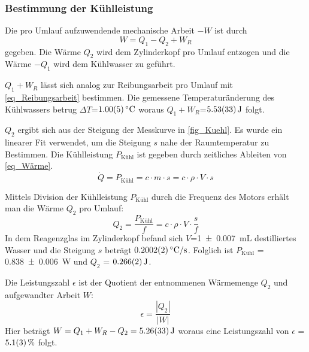 \documentclass[
	a4paper,
	12pt,
	pagesize,
	ngerman
]{scrartcl}
\begin{document}
	\subsubsection{Bestimmung der Kühlleistung} \label{sssec_Kühlleistung}
	Die pro Umlauf aufzuwendende mechanische Arbeit $-W$ ist durch
	\begin{equation}
	W =  Q_1 - Q_2 + W_R
	\end{equation}
	gegeben.
	Die Wärme $Q_2$ wird dem Zylinderkopf pro Umlauf entzogen und die Wärme $-Q_1$ wird dem Kühlwasser zu geführt.
	
	$Q_1+W_R$ lässt sich analog zur Reibungsarbeit pro Umlauf mit \cref{eq_Reibungsarbeit} bestimmen.	
	Die gemessene Temperaturänderung des Kühlwassers betrug $\Delta{T}$=$\SI{1,0+-0,05}{\degreeCelsius}$ woraus $Q_1+W_R$=$\SI{5,53+-0,33}{J}$ folgt.
	
	$Q_2$ ergibt sich aus der Steigung der Messkurve in \cref{fig_Kuehl}.
	Es wurde ein linearer Fit verwendet, um die Steigung $s$ nahe der Raumtemperatur zu Bestimmen.
	Die Kühlleistung $P_\text{Kühl}$ ist gegeben durch zeitliches Ableiten von \cref{eq_Wärme}.
	\begin{equation}
	\dot{Q} = P_\text{Kühl} = c \cdot m \cdot s = c \cdot \rho \cdot V \cdot s 
	\label{eq_Kühlleistung}
	\end{equation}
	
	Mittels Division der Kühlleistung $P_\text{Kühl}$ durch die Frequenz des Motors erhält man die Wärme $Q_2$ pro Umlauf:
	\begin{equation}
	Q_2 = \frac{P_\text{Kühl}}{f} = c \cdot \rho \cdot V \cdot \frac{s}{f}	
	\end{equation}
	In dem Reagenzglas im Zylinderkopf befand sich $V$=\SI{1+- 0,007}{mL} destilliertes Wasser und die Steigung $s$ beträgt $\SI{0,2002+-0,0002}{\degreeCelsius/s}$. %
	Folglich ist $P_\text{Kühl}$ = \SI{0,838+-0,006}{W} und $Q_2$ = $\SI{0,266+-0,002}{J}$.
	
	Die Leistungszahl $\epsilon$ ist der Quotient der entnommenen Wärmemenge $Q_2$ und aufgewandter Arbeit $W$:
	\begin{equation}
		\epsilon = \frac{|Q_2|}{|W|}
		\label{eq_Leistungszahl}
	\end{equation}
	Hier beträgt $W=Q_1+W_R-Q_2=\SI{5,26+-0,33}{J}$ woraus eine Leistungszahl von $\epsilon$ = $\SI{5,1 +- 0,3}{\%}$ folgt.
	
\end{document}
